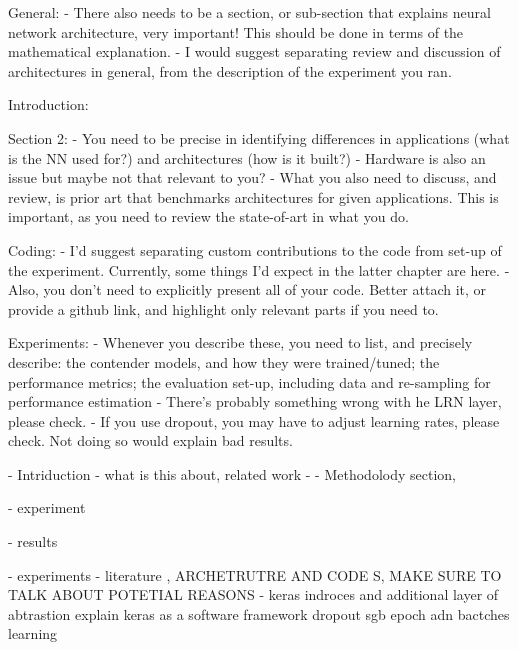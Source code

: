 General:
-	There also needs to be a section, or sub-section that explains neural network architecture, very important!
This should be done in terms of the mathematical explanation.
-	I would suggest separating review and discussion of architectures in general, from the description of the experiment you ran.

Introduction:

Section 2:
-	You need to be precise in identifying differences in applications (what is the NN used for?) and architectures (how is it built?)
-	Hardware is also an issue but maybe not that relevant to you?
-	What you also need to discuss, and review, is prior art that benchmarks architectures for given applications. This is important, as you need to review the state-of-art in what you do.

Coding:
-	I’d suggest separating custom contributions to the code from set-up of the experiment. Currently, some things I’d expect in the latter chapter are here.
-	Also, you don’t need to explicitly present all of your code. Better attach it, or provide a github link, and highlight only relevant parts if you need to.

Experiments:
-	Whenever you describe these, you need to list, and precisely describe: the contender models, and how they were trained/tuned; the performance metrics; the evaluation set-up, including data and re-sampling for performance estimation
-	There’s probably something wrong with he LRN layer, please check.
-	If you use dropout, you may have to adjust learning rates, please check. Not doing so would explain bad results.



- Intriduction - what is this about, related work
-
- Methodolody section,

- experiment

- results

- experiments
- literature , ARCHETRUTRE AND CODE S, MAKE SURE TO TALK ABOUT POTETIAL REASONS
- keras indroces and additional layer of abtrastion
explain  keras as a software framework
dropout
sgb epoch adn bactches
learning

